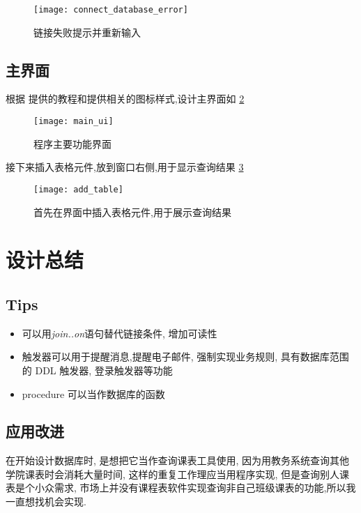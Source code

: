 \documentclass{myreport}
\begin{document}
    \begin{figure}[H]
      \centering
      \texttt{[image: connect\_database\_error]}
      \caption{链接失败提示并重新输入}
      \label{fig:connect_database_error}
    \end{figure}

  \subsection{主界面}
    根据 \cite{pyqt5_beautify} 提供的教程和\cite{icon}提供相关的图标样式,设计主界面如
    \cref{fig:main_ui}
    \begin{figure}[H]
      \centering
      \texttt{[image: main\_ui]}
      \caption{程序主要功能界面}
      \label{fig:main_ui}
    \end{figure}

    接下来插入表格元件,放到窗口右侧,用于显示查询结果
    \cref{fig:add_table}
    \begin{figure}[H]
      \centering
      \texttt{[image: add\_table]}
      \caption{首先在界面中插入表格元件,用于展示查询结果}
      \label{fig:add_table}
    \end{figure}

\section{设计总结}
  \subsection{Tips}
    \begin{itemize}
      \item 可以用\emph{join..on}语句替代链接条件, 增加可读性
      \item 触发器可以用于提醒消息,提醒电子邮件,
        强制实现业务规则,
        具有数据库范围的 DDL 触发器,
        登录触发器等功能
      \item procedure 可以当作数据库的函数
    \end{itemize}
  \subsection{应用改进}
    在开始设计数据库时, 是想把它当作查询课表工具使用,
    因为用教务系统查询其他学院课表时会消耗大量时间,
    这样的重复工作理应当用程序实现,
    但是查询别人课表是个小众需求, 市场上并没有课程表软件实现查询非自己班级课表的功能,所以我一直想找机会实现.
\end{document}
